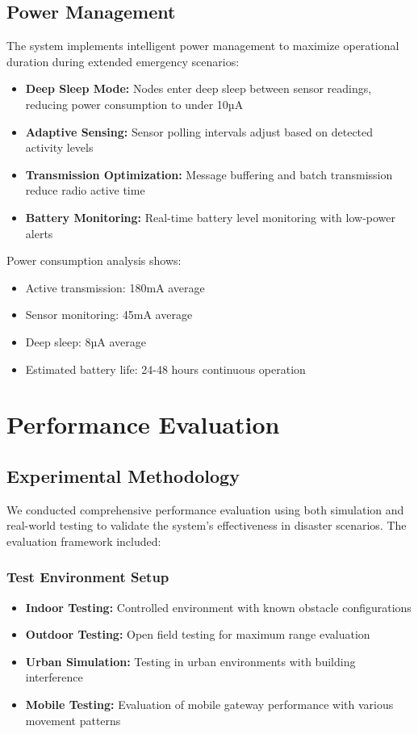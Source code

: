 \documentclass[conference]{IEEEtran}
\begin{document}
\subsection{Power Management}

The system implements intelligent power management to maximize operational duration during extended emergency scenarios:

\begin{itemize}
\item \textbf{Deep Sleep Mode:} Nodes enter deep sleep between sensor readings, reducing power consumption to under 10µA
\item \textbf{Adaptive Sensing:} Sensor polling intervals adjust based on detected activity levels
\item \textbf{Transmission Optimization:} Message buffering and batch transmission reduce radio active time
\item \textbf{Battery Monitoring:} Real-time battery level monitoring with low-power alerts
\end{itemize}

Power consumption analysis shows:
\begin{itemize}
\item Active transmission: 180mA average
\item Sensor monitoring: 45mA average  
\item Deep sleep: 8µA average
\item Estimated battery life: 24-48 hours continuous operation
\end{itemize}

\section{Performance Evaluation}

\subsection{Experimental Methodology}

We conducted comprehensive performance evaluation using both simulation and real-world testing to validate the system's effectiveness in disaster scenarios. The evaluation framework included:

\subsubsection{Test Environment Setup}
\begin{itemize}
\item \textbf{Indoor Testing:} Controlled environment with known obstacle configurations
\item \textbf{Outdoor Testing:} Open field testing for maximum range evaluation
\item \textbf{Urban Simulation:} Testing in urban environments with building interference
\item \textbf{Mobile Testing:} Evaluation of mobile gateway performance with various movement patterns
\end{itemize}
\end{document}
